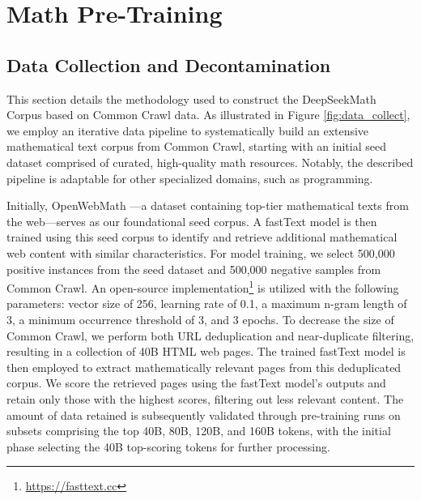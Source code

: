 \section{Math Pre-Training}

\subsection{Data Collection and Decontamination} This section details the methodology used to construct the DeepSeekMath Corpus based on Common Crawl data. As illustrated in Figure \ref{fig:data_collect}, we employ an iterative data pipeline to systematically build an extensive mathematical text corpus from Common Crawl, starting with an initial seed dataset comprised of curated, high-quality math resources. Notably, the described pipeline is adaptable for other specialized domains, such as programming.

Initially, OpenWebMath \citep{openwebmath}—a dataset containing top-tier mathematical texts from the web—serves as our foundational seed corpus. A fastText model \citep{joulin2016fasttext} is then trained using this seed corpus to identify and retrieve additional mathematical web content with similar characteristics. For model training, we select 500,000 positive instances from the seed dataset and 500,000 negative samples from Common Crawl. An open-source implementation\footnote{\url{https://fasttext.cc}} is utilized with the following parameters: vector size of 256, learning rate of 0.1, a maximum n-gram length of 3, a minimum occurrence threshold of 3, and 3 epochs. To decrease the size of Common Crawl, we perform both URL deduplication and near-duplicate filtering, resulting in a collection of 40B HTML web pages. The trained fastText model is then employed to extract mathematically relevant pages from this deduplicated corpus. We score the retrieved pages using the fastText model’s outputs and retain only those with the highest scores, filtering out less relevant content. The amount of data retained is subsequently validated through pre-training runs on subsets comprising the top 40B, 80B, 120B, and 160B tokens, with the initial phase selecting the 40B top-scoring tokens for further processing.


